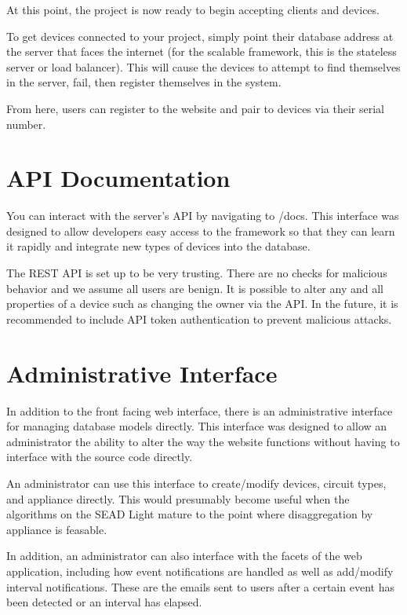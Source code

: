 \documentclass[letterpaper,10pt,english]{sphinxmanual}
\begin{document}
At this point, the project is now ready to begin accepting clients and devices.

To get devices connected to your project, simply point their database address at the server that faces the internet (for the scalable framework, this is the stateless server or load balancer). This will cause the devices to attempt to find themselves in the server, fail, then register themselves in the system.

From here, users can register to the website and pair to devices via their serial number.


\section{API Documentation}
\label{getting-started:api-documentation}
You can interact with the server's API by navigating to /docs. This interface was designed to allow developers easy access to the framework so that they can learn it rapidly and integrate new types of devices into the database.

The REST API is set up to be very trusting. There are no checks for malicious behavior and we assume all users are benign. It is possible to alter any and all properties of a device such as changing the owner via the API. In the future, it is recommended to include API token authentication to prevent malicious attacks.


\section{Administrative Interface}
\label{getting-started:administrative-interface}
In addition to the front facing web interface, there is an administrative interface for managing database models directly. This interface was designed to allow an administrator the ability to alter the way the website functions without having to interface with the source code directly.

An administrator can use this interface to create/modify devices, circuit types, and appliance directly. This would presumably become useful when the algorithms on the SEAD Light mature to the point where disaggregation by appliance is feasable.

In addition, an administrator can also interface with the facets of the web application, including how event notifications are handled as well as add/modify interval notifications. These are the emails sent to users after a certain event has been detected or an interval has elapsed.
\end{document}
